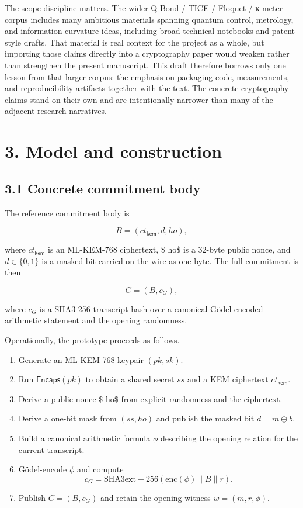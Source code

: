 \documentclass[
  11pt,
]{article}
\providecommand{\tightlist}{%
  \setlength{\itemsep}{0pt}\setlength{\parskip}{0pt}}
\begin{document}
The scope discipline matters. The wider Q-Bond / TICE / Floquet /
κ-meter corpus includes many ambitious materials spanning quantum
control, metrology, and information-curvature ideas, including broad
technical notebooks and patent-style drafts. That material is real
context for the project as a whole, but importing those claims directly
into a cryptography paper would weaken rather than strengthen the
present manuscript. This draft therefore borrows only one lesson from
that larger corpus: the emphasis on packaging code, measurements, and
reproducibility artifacts together with the text. The concrete
cryptography claims stand on their own and are intentionally narrower
than many of the adjacent research narratives.

\section{3. Model and construction}\label{model-and-construction}

\subsection{3.1 Concrete commitment
body}\label{concrete-commitment-body}

The reference commitment body is

\[
B=(ct_{\mathsf{kem}}, d, 
ho),
\]

where \(ct_{\mathsf{kem}}\) is an ML-KEM-768 ciphertext, \$ ho\$ is a
32-byte public nonce, and \(d\in\{0,1\}\) is a masked bit carried on the
wire as one byte. The full commitment is then

\[
C=(B,c_G),
\]

where \(c_G\) is a SHA3-256 transcript hash over a canonical
Gödel-encoded arithmetic statement and the opening randomness.

Operationally, the prototype proceeds as follows.

\begin{enumerate}
\def\labelenumi{\arabic{enumi}.}
\tightlist
\item
  Generate an ML-KEM-768 keypair \((pk,sk)\).
\item
  Run \(\mathsf{Encaps}(pk)\) to obtain a shared secret \(ss\) and a KEM
  ciphertext \(ct_{\mathsf{kem}}\).
\item
  Derive a public nonce \$ ho\$ from explicit randomness and the
  ciphertext.
\item
  Derive a one-bit mask from \((ss,
  ho)\) and publish the masked bit \(d=m\oplus b\).
\item
  Build a canonical arithmetic formula \(\phi\) describing the opening
  relation for the current transcript.
\item
  Gödel-encode \(\phi\) and compute \[
  c_G = \mathrm{SHA3   ext{-}256}(\mathrm{enc}(\phi)\parallel B\parallel r).
  \]
\item
  Publish \(C=(B,c_G)\) and retain the opening witness \(w=(m,r,\phi)\).
\end{enumerate}
\end{document}

